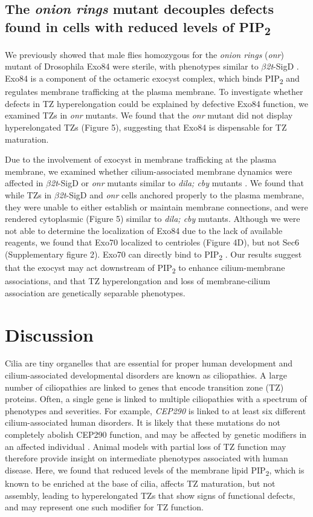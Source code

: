 \documentclass[12pt, twoside, letterpaper]{article}
\newcommand{\PIP}{PIP\textsubscript{2}}
\newcommand{\sigd}{$\beta$\textit{2t}-SigD}
\begin{document}
\subsection{The \textit{onion rings} mutant decouples defects found in cells with reduced levels of \PIP{}}
We previously showed that male flies homozygous for the \textit{onion rings}
(\textit{onr}) mutant of Drosophila Exo84 were sterile, with phenotypes
similar to \sigd{} \citep{wei2008depletion}.
Exo84 is a component of the octameric exocyst complex, which binds
\PIP{} and regulates membrane trafficking at the plasma membrane.
To investigate whether defects in TZ hyperelongation could be explained by
defective Exo84 function, we examined TZs in \textit{onr} mutants.
We found that the \textit{onr} mutant did not display hyperelongated TZs (Figure 5),
suggesting that Exo84 is dispensable for TZ maturation.

Due to the involvement of exocyst in membrane trafficking at the plasma membrane,
we examined whether cilium-associated membrane dynamics were affected in \sigd{}
or \textit{onr} mutants similar to \textit{dila; cby} mutants
\citep{vieillard2016transition}.
We found that while TZs in \sigd{} and \textit{onr} cells anchored properly
to the plasma membrane, they were unable to either establish or maintain
membrane connections, and were rendered cytoplasmic (Figure 5) similar to
\textit{dila; cby} mutants.
Although we were not able to determine the localization of Exo84 due to the
lack of available reagents,
we found that Exo70 localized to centrioles (Figure 4D),
but not Sec6 (Supplementary figure 2).
Exo70 can directly bind to \PIP{} \citep{he2007exo70}.
Our results suggest that the exocyst may act downstream of \PIP{} to
enhance cilium-membrane associations, and that TZ hyperelongation and loss of
membrane-cilium association are genetically separable phenotypes.


\section{Discussion}
Cilia are tiny organelles that are essential for proper human development
and cilium-associated developmental disorders are known as ciliopathies.
A large number of ciliopathies are linked to genes that encode
transition zone (TZ) proteins.
Often, a single gene is linked to multiple ciliopathies with
a spectrum of phenotypes and severities.
For example, \textit{CEP290} is linked to at least six different
cilium-associated human disorders.
It is likely that these mutations do not completely abolish CEP290
function, and may be affected by genetic modifiers in an affected individual
\citep{zaghloul2010functional, khanna2009common, leitch2008hypomorphic}.
Animal models with partial loss of TZ function may therefore provide
insight on intermediate phenotypes associated with human disease.
Here, we found that reduced levels of the membrane lipid \PIP{},
which is known to be enriched at the base of cilia,
affects TZ maturation, but not assembly,
leading to hyperelongated TZs that show signs of functional defects, and
may represent one such modifier for TZ function.
\end{document}
